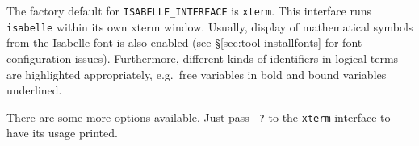 The factory default for \texttt{ISABELLE_INTERFACE} is \texttt{xterm}.
This interface runs \texttt{isabelle} within its own xterm window.
Usually, display of mathematical symbols from the Isabelle font is
also enabled (see \S\ref{sec:tool-installfonts} for font configuration
issues).  Furthermore, different kinds of identifiers in logical terms
are highlighted appropriately, e.g.\ free variables in bold and bound
variables underlined.

There are some more options available.  Just pass \texttt{-?} to the
\texttt{xterm} interface to have its usage printed.
